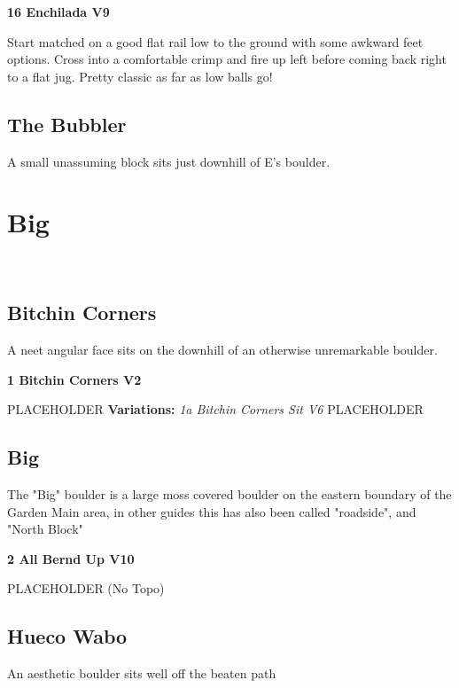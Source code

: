 \begin{multicols}{2}
					\label{rt:Enchilada} \colorbox{Goldenrod!50}{\textbf{16 Enchilada V9 \ding{72}   }}
					\begin{adjustwidth}{1cm}{}
					Start matched on a good flat rail low to the ground with some awkward feet options. Cross into a comfortable crimp and fire up left before coming back right to a flat jug. Pretty classic as far as low balls go!
					\end{adjustwidth}
			\subsection*{The Bubbler}\label{bf:The Bubbler}
			A small unassuming block sits just downhill of E's boulder.
			
		\section{Big}\label{sa:Big}
	\
			\subsection*{Bitchin Corners}\label{bf:Bitchin Corners}
			A neet angular face sits on the downhill of an otherwise unremarkable boulder.
			

					\label{rt:Bitchin Corners} \colorbox{green!20}{\textbf{1 Bitchin Corners V2  }}
					\begin{adjustwidth}{1cm}{}
					PLACEHOLDER
					\newline \textbf{Variations:} \newline
						\label{vr:Bitchin Corners Sit} \colorbox{RoyalBlue!20}{\emph{1a Bitchin Corners Sit V6  }}
						PLACEHOLDER
					\end{adjustwidth}
			\subsection*{Big}\label{bf:Big}
			The "Big" boulder is a large moss covered boulder on the eastern boundary of the Garden Main area, in other guides this has also been called "roadside", and "North Block"
			
					\label{rt:All Bernd Up} \colorbox{red!20}{\textbf{2 All Bernd Up V10  }}
					\begin{adjustwidth}{1cm}{}
					PLACEHOLDER
						\newline (No Topo) 
					\end{adjustwidth}
			\subsection*{Hueco Wabo}\label{bf:Hueco Wabo}
			An aesthetic boulder sits well off the beaten path
			

\end{multicols}
